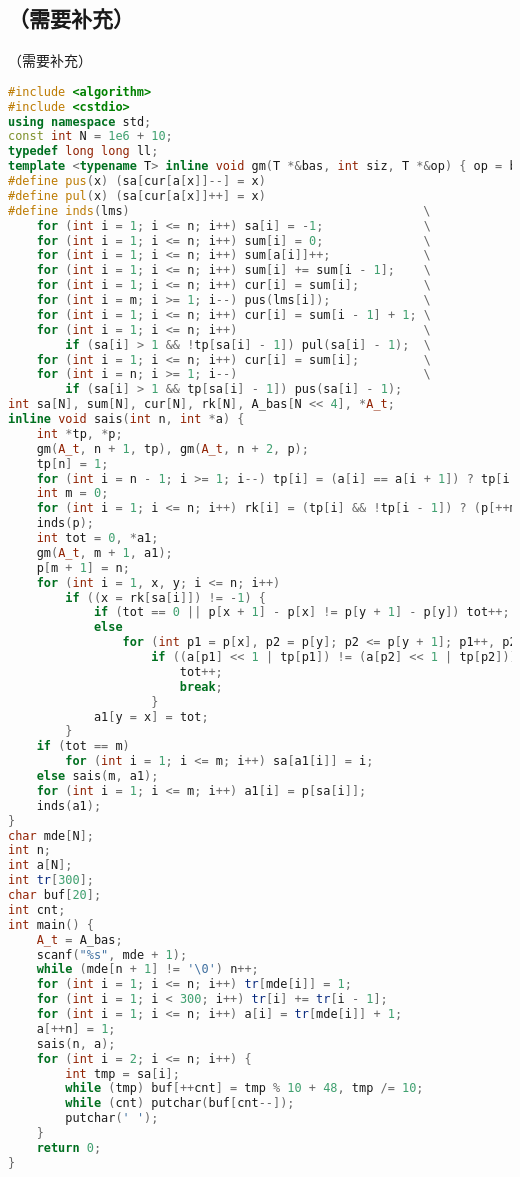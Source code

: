 \documentclass[9pt, a4paper, oneside]{book}
\begin{document}
\subsection{（需要补充）}
（需要补充）
\begin{lstlisting}[language={C++}]
#include <algorithm>
#include <cstdio>
using namespace std;
const int N = 1e6 + 10;
typedef long long ll;
template <typename T> inline void gm(T *&bas, int siz, T *&op) { op = bas, bas += siz; }
#define pus(x) (sa[cur[a[x]]--] = x)
#define pul(x) (sa[cur[a[x]]++] = x)
#define inds(lms)                                         \
    for (int i = 1; i <= n; i++) sa[i] = -1;              \
    for (int i = 1; i <= n; i++) sum[i] = 0;              \
    for (int i = 1; i <= n; i++) sum[a[i]]++;             \
    for (int i = 1; i <= n; i++) sum[i] += sum[i - 1];    \
    for (int i = 1; i <= n; i++) cur[i] = sum[i];         \
    for (int i = m; i >= 1; i--) pus(lms[i]);             \
    for (int i = 1; i <= n; i++) cur[i] = sum[i - 1] + 1; \
    for (int i = 1; i <= n; i++)                          \
        if (sa[i] > 1 && !tp[sa[i] - 1]) pul(sa[i] - 1);  \
    for (int i = 1; i <= n; i++) cur[i] = sum[i];         \
    for (int i = n; i >= 1; i--)                          \
        if (sa[i] > 1 && tp[sa[i] - 1]) pus(sa[i] - 1);
int sa[N], sum[N], cur[N], rk[N], A_bas[N << 4], *A_t;
inline void sais(int n, int *a) {
    int *tp, *p;
    gm(A_t, n + 1, tp), gm(A_t, n + 2, p);
    tp[n] = 1;
    for (int i = n - 1; i >= 1; i--) tp[i] = (a[i] == a[i + 1]) ? tp[i + 1] : (a[i] < a[i + 1]);
    int m = 0;
    for (int i = 1; i <= n; i++) rk[i] = (tp[i] && !tp[i - 1]) ? (p[++m] = i, m) : -1;
    inds(p);
    int tot = 0, *a1;
    gm(A_t, m + 1, a1);
    p[m + 1] = n;
    for (int i = 1, x, y; i <= n; i++)
        if ((x = rk[sa[i]]) != -1) {
            if (tot == 0 || p[x + 1] - p[x] != p[y + 1] - p[y]) tot++;
            else
                for (int p1 = p[x], p2 = p[y]; p2 <= p[y + 1]; p1++, p2++)
                    if ((a[p1] << 1 | tp[p1]) != (a[p2] << 1 | tp[p2])) {
                        tot++;
                        break;
                    }
            a1[y = x] = tot;
        }
    if (tot == m)
        for (int i = 1; i <= m; i++) sa[a1[i]] = i;
    else sais(m, a1);
    for (int i = 1; i <= m; i++) a1[i] = p[sa[i]];
    inds(a1);
}
char mde[N];
int n;
int a[N];
int tr[300];
char buf[20];
int cnt;
int main() {
    A_t = A_bas;
    scanf("%s", mde + 1);
    while (mde[n + 1] != '\0') n++;
    for (int i = 1; i <= n; i++) tr[mde[i]] = 1;
    for (int i = 1; i < 300; i++) tr[i] += tr[i - 1];
    for (int i = 1; i <= n; i++) a[i] = tr[mde[i]] + 1;
    a[++n] = 1;
    sais(n, a);
    for (int i = 2; i <= n; i++) {
        int tmp = sa[i];
        while (tmp) buf[++cnt] = tmp % 10 + 48, tmp /= 10;
        while (cnt) putchar(buf[cnt--]);
        putchar(' ');
    }
    return 0;
}\end{lstlisting}
\end{document}
